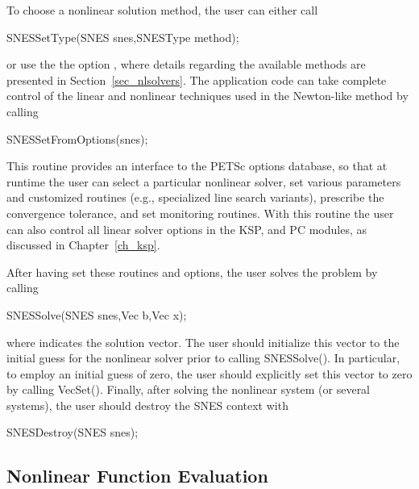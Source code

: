 To choose a nonlinear solution method, the user can either
call 
\begin{tabbing}
  SNESSetType(SNES snes,SNESType method);
\end{tabbing}
or use the the option ,  
where details regarding the available methods are presented in
Section~\ref{sec_nlsolvers}.
The application code can take complete control of the linear and
nonlinear techniques used in the Newton-like method by calling
\begin{tabbing}
  SNESSetFromOptions(snes);
\end{tabbing}
This routine provides an interface to the PETSc options database, so
that at runtime the user can select a particular nonlinear solver, set
various parameters and customized routines (e.g., specialized line
search variants), prescribe the convergence tolerance, and set
monitoring routines.  With this routine the user can also control all
linear solver options in the KSP, and PC modules, as discussed
in Chapter~\ref{ch_ksp}.

After having set these routines and options, the user
solves the problem by calling 
\begin{tabbing}
  SNESSolve(SNES snes,Vec b,Vec x);
\end{tabbing}
where  indicates the solution vector. The user should
initialize this vector to the initial guess for the nonlinear solver
prior to calling SNESSolve().  In particular, to employ an
initial guess of zero, the user should explicitly set this vector to
zero by calling VecSet().  Finally, after solving the nonlinear
system (or several systems), the user should destroy the SNES context
with
\begin{tabbing}
  SNESDestroy(SNES snes);
\end{tabbing}

\subsection{Nonlinear Function Evaluation}
\label{sec_snesfunction}

